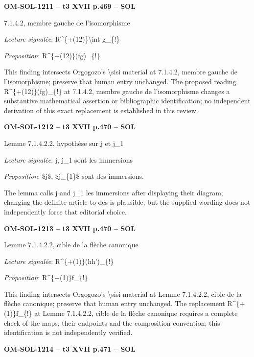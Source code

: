 \par\noindent\textbf{OM-SOL-1211 -- t3 XVII p.469 -- SOL}\par
7.1.4.2, membre gauche de l'isomorphisme\par
\emph{Lecture signalée}: R\textasciicircum{}\{+(12)\}\textbackslash{}int g\_\{!\}\par
\emph{Proposition}: R\textasciicircum{}\{+(12)\}(fg)\_\{!\}\par
This finding intersects Orgogozo's \textbackslash{}sisi material at 7.1.4.2, membre gauche de l'isomorphisme; preserve that human entry unchanged. The proposed reading R\textasciicircum{}\{+(12)\}(fg)\_\{!\} at 7.1.4.2, membre gauche de l'isomorphisme changes a substantive mathematical assertion or bibliographic identification; no independent derivation of this exact replacement is established in this review.\par
\par\noindent\textbf{OM-SOL-1212 -- t3 XVII p.470 -- SOL}\par
Lemme 7.1.4.2.2, hypothèse sur j et j\_1\par
\emph{Lecture signalée}: j, j\_1 sont les immersions\par
\emph{Proposition}: \$j\$, \$j\_\{1\}\$ sont des immersions.\par
The lemma calls j and j\_1 les immersions after displaying their diagram; changing the definite article to des is plausible, but the supplied wording does not independently force that editorial choice.\par
\par\noindent\textbf{OM-SOL-1213 -- t3 XVII p.470 -- SOL}\par
Lemme 7.1.4.2.2, cible de la flèche canonique\par
\emph{Lecture signalée}: R\textasciicircum{}\{+(1)\}(hh')\_\{!\}\par
\emph{Proposition}: R\textasciicircum{}\{+(1)\}f\_\{!\}\par
This finding intersects Orgogozo's \textbackslash{}sisi material at Lemme 7.1.4.2.2, cible de la flèche canonique; preserve that human entry unchanged. The replacement R\textasciicircum{}\{+(1)\}f\_\{!\} at Lemme 7.1.4.2.2, cible de la flèche canonique requires a complete check of the maps, their endpoints and the composition convention; this identification is not independently verified.\par
\par\noindent\textbf{OM-SOL-1214 -- t3 XVII p.471 -- SOL}\par
